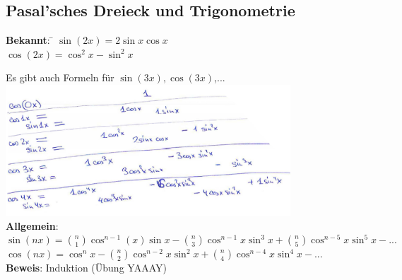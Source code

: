 \subsection{Pasal'sches Dreieck und Trigonometrie}
\begin{tabbing}
	\textbf{Bekannt}: \= $\sin(2x) = 2\sin x \cos x$\\
	\> $\cos(2x)=\cos^2x-\sin^2x$
\end{tabbing}
Es gibt auch Formeln für $\sin(3x) , \cos(3x)$,...\smallskip\\
\includegraphics[width=0.8\textwidth]{img/ayy.PNG}\medskip\\
\textbf{Allgemein}:\\
$\sin(nx) = \binom{n}{1}\cos^{n-1}(x) \sin x - \binom{n}{3}\cos^{n-1}x \sin^3x + \binom{n}{5} \cos^{n-5}x \sin^5x-...$\medskip\\
$\cos(nx) = \cos^nx - \binom{n}{2}\cos^{n-2}x\sin^2x+\binom{n}{4}\cos^{n-4}x\sin^4x-...$\medskip\\
\textbf{Beweis}: Induktion (Übung YAAAY)

